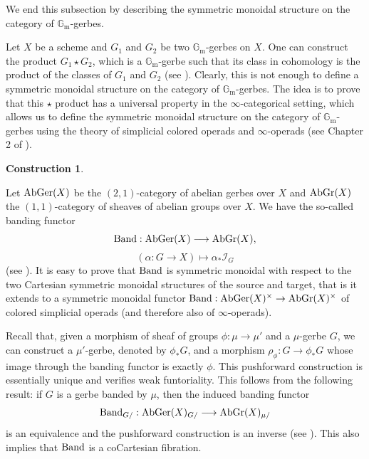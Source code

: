 \documentclass[11pt, twoside]{article} %
\numberwithin{equation}{section}
\theoremstyle{plain}
\theoremstyle{definition}
\newtheorem{construction}[thm]{Construction}
\newcommand{\Gm}{\mathbb G_{\mathrm{m}}}
\newcommand{\cI}{\mathcal I}
\newcommand{\AbGer}{\textup{AbGer}}
\newcommand{\Band}{\textup{Band}}
\newcommand{\AbGr}{\textup{AbGr}}
\begin{document}
We end this subsection by describing the symmetric monoidal structure on the category of $\Gm$-gerbes. 

    Let $X$ be a scheme and $G_1$ and $G_2$ be two $\Gm$-gerbes on $X$. One can construct the product $G_1 \star G_2$, which is a $\Gm$-gerbe such that its class in cohomology is the product of the classes of $G_1$ and $G_2$ (see \cite[Conjecture 5.23]{BP}). Clearly, this is not enough to define a symmetric monoidal structure on the category of $\Gm$-gerbes. The idea is to prove that this $\star$ product has a universal property in the $\infty$-categorical setting, which allows us to define the symmetric monoidal structure on the category of $\Gm$-gerbes using the theory of simplicial colored operads and $\infty$-operads (see Chapter 2 of \cite{HA}).
	 
	 
	\begin{construction}\label{star-product}
	
	Let $\AbGer(X)$ be the $(2,1)$-category of abelian gerbes over $X$ and $\AbGr(X)$ the $(1,1)$-category of sheaves of abelian groups over $X$. We have the so-called banding functor
	$$ \Band: \AbGer(X) \longrightarrow \AbGr(X),$$ 
 $$(\alpha:G\to X)\mapsto \alpha_*\cI_G$$
	(see \cite[(3.2)]{Bergh-Schnurer}). It is easy to prove that $\Band$ is symmetric monoidal with respect to the two Cartesian symmetric monoidal structures of the source and target, that is it extends to a symmetric monoidal functor
    $\Band: \AbGer(X)^{\times} \rightarrow \AbGr(X)^{\times}$ of colored simplicial operads (and therefore also of $\infty$-operads).
    
    Recall that, given a morphism of sheaf of groups $\phi:\mu \rightarrow \mu'$ and a $\mu$-gerbe $G$, we can construct a $\mu'$-gerbe, denoted by $\phi_*G$, and a morphism $\rho_{\phi}:G \rightarrow \phi_*G$ whose image through the banding functor is exactly $\phi$. This pushforward construction is essentially unique and verifies weak funtoriality. This follows from the following result: if $G$ is a gerbe banded by $\mu$, then the induced banding functor 
    $$\textup{Band}_{G/}: \AbGer(X)_{G/} \longrightarrow \AbGr(X)_{\mu/}$$
    is an equivalence and the pushforward construction is an inverse (see \cite[Proposition 3.9]{Bergh-Schnurer}). This also implies that $\Band$ is a coCartesian fibration.
    

\end{construction}
\end{document}

